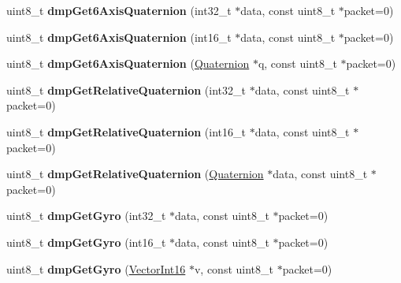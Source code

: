 \begin{DoxyCompactItemize}
\item 
\mbox{\label{class_m_p_u6050_a776c9ba67375bfe59432e7f78c7eab87}} 
uint8\+\_\+t {\bfseries dmp\+Get6\+Axis\+Quaternion} (int32\+\_\+t $\ast$data, const uint8\+\_\+t $\ast$packet=0)
\item 
\mbox{\label{class_m_p_u6050_a9c074fce94329c3f41aa6cddc2080358}} 
uint8\+\_\+t {\bfseries dmp\+Get6\+Axis\+Quaternion} (int16\+\_\+t $\ast$data, const uint8\+\_\+t $\ast$packet=0)
\item 
\mbox{\label{class_m_p_u6050_a2fff9f9904645926472a7527b20d2330}} 
uint8\+\_\+t {\bfseries dmp\+Get6\+Axis\+Quaternion} (\mbox{\hyperlink{class_quaternion}{Quaternion}} $\ast$q, const uint8\+\_\+t $\ast$packet=0)
\item 
\mbox{\label{class_m_p_u6050_a355a874853887baea2e8152a218a1358}} 
uint8\+\_\+t {\bfseries dmp\+Get\+Relative\+Quaternion} (int32\+\_\+t $\ast$data, const uint8\+\_\+t $\ast$packet=0)
\item 
\mbox{\label{class_m_p_u6050_ac74ebf94e4504dfe258d8c739d63d807}} 
uint8\+\_\+t {\bfseries dmp\+Get\+Relative\+Quaternion} (int16\+\_\+t $\ast$data, const uint8\+\_\+t $\ast$packet=0)
\item 
\mbox{\label{class_m_p_u6050_ad1b10602a76de6a84365ff2c3e3ee69d}} 
uint8\+\_\+t {\bfseries dmp\+Get\+Relative\+Quaternion} (\mbox{\hyperlink{class_quaternion}{Quaternion}} $\ast$data, const uint8\+\_\+t $\ast$packet=0)
\item 
\mbox{\label{class_m_p_u6050_a6625cf6f1ceb2e9c2503a590ade6686b}} 
uint8\+\_\+t {\bfseries dmp\+Get\+Gyro} (int32\+\_\+t $\ast$data, const uint8\+\_\+t $\ast$packet=0)
\item 
\mbox{\label{class_m_p_u6050_a8cb79f053e00eb70b898be131b467748}} 
uint8\+\_\+t {\bfseries dmp\+Get\+Gyro} (int16\+\_\+t $\ast$data, const uint8\+\_\+t $\ast$packet=0)
\item 
\mbox{\label{class_m_p_u6050_a97d9c59f863800ea8d804013d860ba08}} 
uint8\+\_\+t {\bfseries dmp\+Get\+Gyro} (\mbox{\hyperlink{class_vector_int16}{Vector\+Int16}} $\ast$v, const uint8\+\_\+t $\ast$packet=0)

\end{DoxyCompactItemize}

